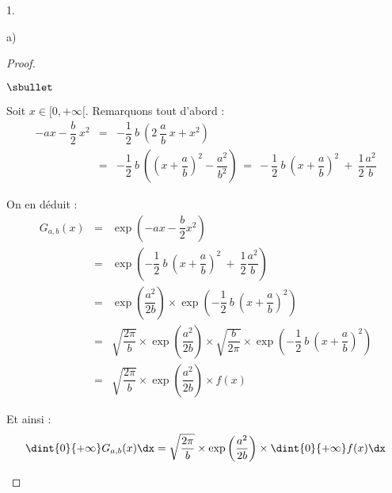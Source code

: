 \documentclass[11pt]{article}%
\begin{document}
\begin{noliste}{1.}
\begin{noliste}{a)}
    \begin{proof}~
      \begin{noliste}{$\sbullet$}
      \item Soit $x \in [0, +\infty[$. Remarquons tout d'abord :
        \[
        \begin{array}{rcl}
          -a x - \dfrac{b}{2} \ x^2 & = & - \dfrac{1}{2} \ b \ \left(
            2 \ \dfrac{a}{b} \ x + x^2 \right) \\[.4cm]
          & = & - \dfrac{1}{2} \ b \ \left( \left( x + \dfrac{a}{b}
            \right)^2 - \dfrac{a^2}{b^2} \right) %
          \ = \ - \dfrac{1}{2} \ b \ \left( x + \dfrac{a}{b}
          \right)^2 \ + \ \dfrac{1}{2} \dfrac{a^2}{b}
        \end{array}
        \]

      \item On en déduit : 
        \[
        \begin{array}{rcl}
          G_{a, b}(x) & = & \exp\left( -ax - \dfrac{b}{2} x^2 \right)
          \\[.4cm]
          & = & \exp\left( - \dfrac{1}{2} \ b \ \left( x + \dfrac{a}{b}
            \right)^2 \ + \ \dfrac{1}{2} \dfrac{a^2}{b} \right)
          \\[.4cm]
          & = & \exp\left( \dfrac{a^2}{2b} \right) \times \exp\left( -
            \dfrac{1}{2} \ b \ \left( x + \dfrac{a}{b} \right)^2 \right)
          \\[.4cm]
          & = & \sqrt{\dfrac{2 \pi}{b}} \times \exp\left(
            \dfrac{a^2}{2b} \right) \times \sqrt{\dfrac{b}{2 \pi}}
          \times \exp\left( - \dfrac{1}{2} \ b \ \left( x +
              \dfrac{a}{b} \right)^2 \right) 
          \\[.4cm]
          & = & \sqrt{\dfrac{2 \pi}{b}} \times \exp\left(
            \dfrac{a^2}{2b} \right) \times f(x)
        \end{array}
        \]

      \item Et ainsi : 
        \[
        \dint{0}{+\infty} G_{a,b}(x) \dx = \sqrt{\dfrac{2 \pi}{b}}
        \times \exp\left( \dfrac{a^2}{2b} \right) \times
        \dint{0}{+\infty} f(x) \dx
        \]


\end{noliste}
\end{proof}
\end{noliste}
\end{noliste}
\end{document}

